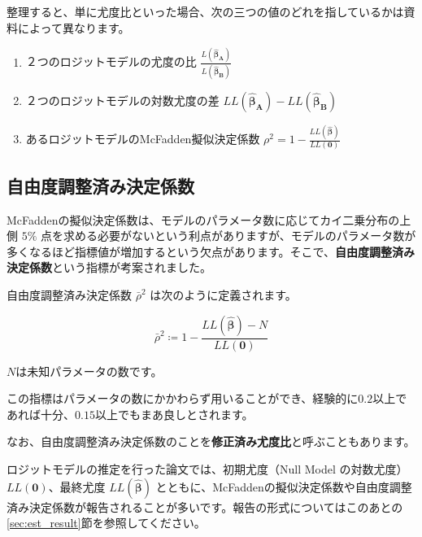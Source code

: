 整理すると、単に尤度比といった場合、次の三つの値のどれを指しているかは資料によって異なります。

\begin{enumerate}
    \item ２つのロジットモデルの尤度の比 $\frac{L(\bm{\hat\beta_A})}{L(\bm{\hat\beta_B})}$
    \item ２つのロジットモデルの対数尤度の差 $LL(\bm{\hat\beta_A})-LL(\bm{\hat\beta_B})$
    \item あるロジットモデルのMcFadden擬似決定係数 $\rho^2=1-\frac{LL(\bm{\hat\beta})}{LL(\bm 0)}$
\end{enumerate}

\subsection{自由度調整済み決定係数}

McFaddenの擬似決定係数は、モデルのパラメータ数に応じてカイ二乗分布の上側 $5\%$ 点を求める必要がないという利点がありますが、モデルのパラメータ数が多くなるほど指標値が増加するという欠点があります。そこで、\textbf{自由度調整済み決定係数}という指標が考案されました。

自由度調整済み決定係数 $\bar\rho^2$ は次のように定義されます。

\begin{equation}
    \bar\rho^2 \coloneq 1-\frac{LL(\bm{\hat\beta})-N}{LL(\bm 0)}
\end{equation}

$N$は未知パラメータの数です。

この指標はパラメータの数にかかわらず用いることができ、経験的に$0.2$以上であれば十分、$0.15$以上でもまあ良しとされます。

なお、自由度調整済み決定係数のことを\textbf{修正済み尤度比}と呼ぶこともあります。

ロジットモデルの推定を行った論文では、初期尤度（Null Model の対数尤度）$LL(\bm 0)$、最終尤度 $LL(\bm{\hat\beta})$ とともに、McFaddenの擬似決定係数や自由度調整済み決定係数が報告されることが多いです。報告の形式についてはこのあとの\ref{sec:est_result}節を参照してください。